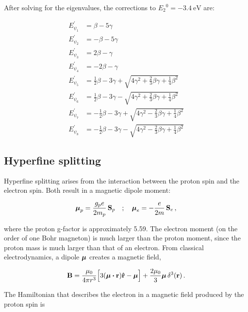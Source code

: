 \documentclass[12pt, titlepage]{article}
\begin{document}
After solving for the eigenvalues, the corrections to ${E_2}^0 = -\SI{3.4}{\eV}$ are:

\begin{subequations}
\begin{align}
	E_{\psi_{1}}^\prime &= \beta-5\gamma \\[4pt]
	E_{\psi_{2}}^\prime &= -\beta-5\gamma \\[4pt]
	E_{\psi_{3}}^\prime &= 2\beta-\gamma \\[4pt]
	E_{\psi_{4}}^\prime &= -2\beta - \gamma \\[4pt]
	E_{\psi_{5}}^\prime &= \frac{1}{2}\beta - 3\gamma +\sqrt{4\gamma^2 + \frac{2}{3}\beta\gamma + \frac{1}{4}\beta^2}\\[4pt]
	E_{\psi_{6}}^\prime &= \frac{1}{2}\beta - 3\gamma - \sqrt{4\gamma^2 + \frac{2}{3}\beta\gamma + \frac{1}{4}\beta^2}\\[4pt]
	E_{\psi_{7}}^\prime &= -\frac{1}{2}\beta - 3\gamma + \sqrt{4\gamma^2 - \frac{2}{3}\beta\gamma + \frac{1}{4}\beta^2}\\[4pt]
	E_{\psi_{8}}^\prime &= -\frac{1}{2}\beta - 3\gamma - \sqrt{4\gamma^2 - \frac{2}{3}\beta\gamma + \frac{1}{4}\beta^2}
\end{align}
\end{subequations}

\subsection{Hyperfine splitting}
Hyperfine splitting arises from the interaction between the proton spin and the electron spin. Both result in a magnetic dipole moment:

\begin{equation}
\vb*{\mu}_p = \frac{g_p e}{2m_p}\,\vb{S}_p \quad;\quad \vb*{\mu}_e = -\frac{e}{2m}\,\vb{S}_e \,,
\end{equation}

where the proton g-factor is approximately 5.59. The electron moment (on the order of one Bohr magneton) is much larger than the proton moment, since the proton mass is much larger than that of an electron. From classical electrodynamics, a dipole $\vb*{\mu}$ creates a magnetic field,

\begin{equation}
\vb{B} = \frac{\mu_0}{4\pi r^3}\Bigl[3(\vb*{\mu}\vdot\vb{r})\vu{r} - \vb*{\mu}\Bigr] + \frac{2\mu_0}{3}\vb*{\mu}\,\delta^3(\vb{r}) \,.
\end{equation}

The Hamiltonian that describes the electron in a magnetic field produced by the proton spin is
\end{document}
